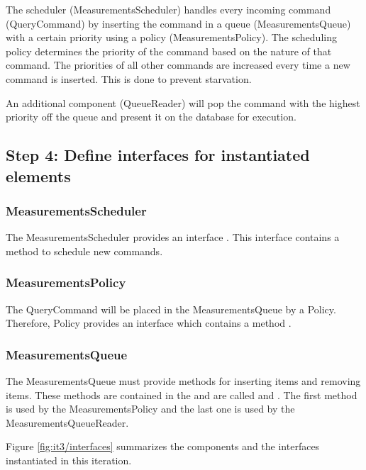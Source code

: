 \npar The scheduler (MeasurementsScheduler) handles every incoming command
(QueryCommand) by inserting the command in a queue (MeasurementsQueue) with a
certain priority using a policy (MeasurementsPolicy). The scheduling policy
determines the priority of the command based on the nature of that command. The
priorities of all other commands are increased every time a new command is
inserted. This is done to prevent starvation.

\npar An additional component (QueueReader) will pop the command with the
highest priority off the queue and present it on the database for execution. 

\subsection{Step 4: Define interfaces for instantiated elements}
\label{add:it3/interfaces}

\subsubsection{MeasurementsScheduler}

\npar The MeasurementsScheduler provides an interface
. This interface contains a method
 to schedule new commands.

\subsubsection{MeasurementsPolicy}

\npar The QueryCommand will be placed in the MeasurementsQueue by a Policy.
Therefore, Policy provides an interface  which
contains a method .

\subsubsection{MeasurementsQueue}

\npar The MeasurementsQueue must provide methods for inserting items and
removing items. These methods are contained in the
 and are called
 and
. The first method is used by the
MeasurementsPolicy and the last one is used by the MeasurementsQueueReader.

\npar Figure \ref{fig:it3/interfaces} summarizes the components and the
interfaces instantiated in this iteration.

